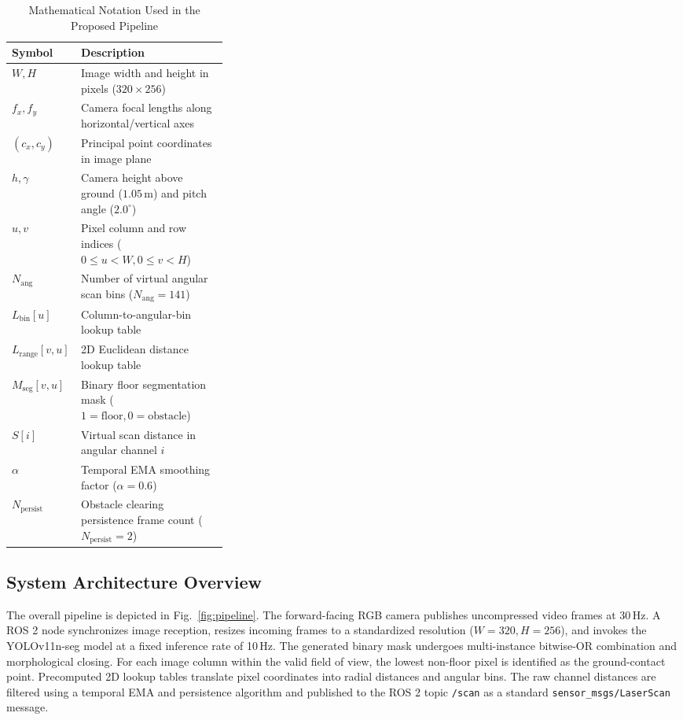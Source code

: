 \documentclass{ieeeaccess}
\begin{document}
\begin{table}[t]
  \centering
  \caption{Mathematical Notation Used in the Proposed Pipeline}
  \label{tab:notation}
  \begin{tabularx}{\linewidth}{@{}p{0.32\linewidth}X@{}}
    \toprule
    Symbol & Description \\
    \midrule
    $W, H$ & Image width and height in pixels ($320 \times 256$) \\
    $f_x, f_y$ & Camera focal lengths along horizontal/vertical axes \\
    $(c_x, c_y)$ & Principal point coordinates in image plane \\
    $h, \gamma$ & Camera height above ground ($1.05$\,m) and pitch angle ($2.0^\circ$) \\
    $u, v$ & Pixel column and row indices ($0 \le u < W, 0 \le v < H$) \\
    $N_{\mathrm{ang}}$ & Number of virtual angular scan bins ($N_{\mathrm{ang}} = 141$) \\
    $L_{\mathrm{bin}}[u]$ & Column-to-angular-bin lookup table \\
    $L_{\mathrm{range}}[v, u]$ & 2D Euclidean distance lookup table \\
    $M_{\mathrm{seg}}[v, u]$ & Binary floor segmentation mask ($1=\text{floor}, 0=\text{obstacle}$) \\
    $S[i]$ & Virtual scan distance in angular channel $i$ \\
    $\alpha$ & Temporal EMA smoothing factor ($\alpha = 0.6$) \\
    $N_{\mathrm{persist}}$ & Obstacle clearing persistence frame count ($N_{\mathrm{persist}} = 2$) \\
    \bottomrule
  \end{tabularx}
\end{table}

\subsection{System Architecture Overview}
The overall pipeline is depicted in Fig.~\ref{fig:pipeline}. The forward-facing RGB camera publishes uncompressed video frames at 30\,Hz. A ROS 2 node synchronizes image reception, resizes incoming frames to a standardized resolution ($W=320, H=256$), and invokes the YOLOv11n-seg model at a fixed inference rate of 10\,Hz. The generated binary mask undergoes multi-instance bitwise-OR combination and morphological closing. For each image column within the valid field of view, the lowest non-floor pixel is identified as the ground-contact point. Precomputed 2D lookup tables translate pixel coordinates into radial distances and angular bins. The raw channel distances are filtered using a temporal EMA and persistence algorithm and published to the ROS 2 topic \texttt{/scan} as a standard \texttt{sensor\_msgs/LaserScan} message.
\end{document}
